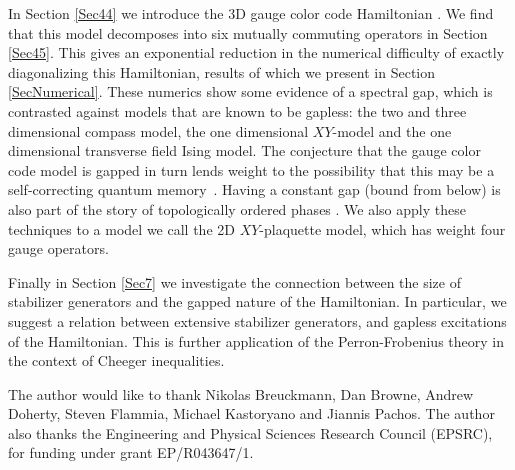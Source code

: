 \documentclass[a4paper,onecolumn,11pt,unpublished]{quantumarticle}
\begin{document}
In Section \ref{Sec44} we introduce the 3D gauge color code Hamiltonian%
\cite{Bombin2015,Bombin2015single,Kubica2015}.
We find that this model 
decomposes into six mutually commuting operators in Section \ref{Sec45}.
This gives an exponential reduction in the numerical
difficulty of exactly diagonalizing this Hamiltonian,
results of which we present in Section \ref{SecNumerical}.
These numerics show some evidence of a spectral
gap, which is contrasted against models that are known
to be gapless: the two and three dimensional compass model,
the one dimensional $XY$-model and 
the one dimensional transverse field Ising model.
The conjecture that the gauge color code model is gapped
in turn lends weight to the possibility that this may
be a self-correcting quantum memory~\cite{Brown2016}.
Having a constant gap (bound from below)
is also part of the story of topologically ordered phases
\cite{Kitaev2003,Brown2016}.
We also apply these techniques to a model
we call the 2D $XY$-plaquette model,
which has weight four gauge operators.

Finally in Section \ref{Sec7} 
we investigate the connection between the size of
stabilizer generators
and the gapped nature of the Hamiltonian.
In particular, we suggest a relation between
extensive stabilizer generators, and gapless excitations of
the Hamiltonian.
This is further application of the Perron-Frobenius 
theory in the context of Cheeger inequalities.


\vskip 5pt 
The author would like to thank 
Nikolas Breuckmann,
Dan Browne,
Andrew Doherty,
Steven Flammia,
Michael Kastoryano and
Jiannis Pachos.
The author also thanks 
the Engineering and Physical Sciences Research Council
(EPSRC), for funding under grant EP/R043647/1.


%
%

\end{document}
